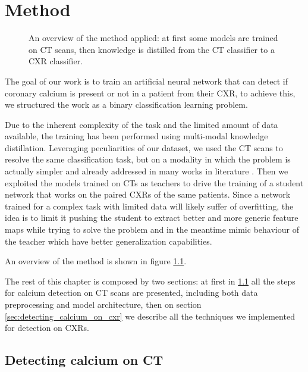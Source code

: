 \chapter{Method}\label{sec:method}
\begin{figure}
    \centering
    \caption{An overview of the method applied: at first some models are trained on CT scans, then knowledge is distilled from the CT classifier
    to a CXR classifier.}
    \label{fig:method}
\end{figure}

The goal of our work is to train an artificial neural network that can detect if coronary calcium is present or not in a patient from their CXR, to achieve this, we structured the work as a binary classification learning problem.

Due to the inherent complexity of the task and the limited amount of data available, the training has been performed using multi-modal knowledge distillation.
Leveraging peculiarities of our dataset, we used the CT scans to resolve the same classification task, but on a modality in which the problem is actually simpler and already addressed in many works in literature \cite{vanvelzen2021ai}.
Then we exploited the models trained on CTs as teachers to drive the training of a student network that works on the paired CXRs of the same patients.
Since a network trained for a complex task with limited data will likely suffer of overfitting, the idea is to limit it pushing the student to extract better and more generic feature maps while trying to solve the problem and in the meantime mimic behaviour of the teacher which have better generalization capabilities.

An overview of the method is shown in figure \ref{fig:method}.

The rest of this chapter is composed by two sections: at first in \ref{sec:detecting_calcium_on_ct} all the steps for calcium detection on CT scans are presented, including both data preprocessing and model architecture, then on section \ref{sec:detecting_calcium_on_cxr} we describe all the techniques we implemented for detection on CXRs.


\section{Detecting calcium on CT}\label{sec:detecting_calcium_on_ct}

